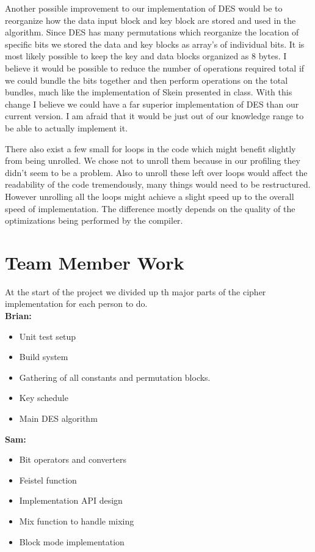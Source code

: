 \documentclass[12pt]{article}
\begin{document}
  Another possible improvement to our implementation of DES would be to reorganize how the data input block and key block
  are stored and used in the algorithm. Since DES has many permutations which reorganize the location of specific bits we 
  stored the data and key blocks as array's of individual bits. It is most likely possible to keep the key and data blocks
  organized as 8 bytes. I believe it would be possible to reduce the number of operations required total if we could bundle the 
  bits together and then perform operations on the total bundles, much like the implementation of Skein presented in class. 
  With this change I believe we could have a far superior implementation of DES than our current version. I am afraid that it
  would be just out of our knowledge range to be able to actually implement it. 

  There also exist a few small for loops in the code which might benefit slightly from being unrolled.
  We chose not to unroll them because in our profiling they didn't seem to be a problem. Also to unroll
  these left over loops would affect the readability of the code tremendously, many things would need to be 
  restructured. However unrolling all the loops might achieve a slight speed up to the overall speed of implementation.
  The difference mostly depends on the quality of the optimizations being performed by the compiler.

\section{Team Member Work}

  At the start of the project we divided up th major parts of the cipher implementation for each person to do. \\


  \textbf{Brian:}
  \begin{itemize}
    \item Unit test setup
    \item Build system
    \item Gathering of all constants and permutation blocks.
    \item Key schedule 
    \item Main DES algorithm
  \end{itemize}

  \textbf{Sam:}
  \begin{itemize}
    \item Bit operators and converters
    \item Feistel function
    \item Implementation API design
    \item Mix function to handle mixing
    \item Block mode implementation
  \end{itemize}
\end{document}

